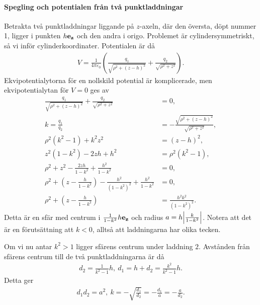 \paragraph{Spegling och potentialen från två punktladdningar}
Betrakta två punktladdningar liggande på $z$-axeln, där den översta, döpt nummer 1, ligger i punkten $h\vb{e}_{\vb{z}}$ och den andra i origo. Problemet är cylindersymmetriskt, så vi inför cylinderkoordinater. Potentialen är då
\begin{align*}
	V = \frac{1}{4\pi\varepsilon_{0}}\left(\frac{q_{1}}{\sqrt{\rho^{2} + (z - h)^{2}}} + \frac{q_{2}}{\sqrt{\rho^{2} + z^{2}}}\right).
\end{align*}
Ekvipotentialytorna för en nollskild potential är komplicerade, men ekvipotentialytan för $V = 0$ ges av
\begin{align*}
	\frac{q_{1}}{\sqrt{\rho^{2} + (z - h)^{2}}} + \frac{q_{2}}{\sqrt{\rho^{2} + z^{2}}} &= 0, \\
	k = \frac{q_{1}}{q_{2}}                                                             &= -\frac{\sqrt{\rho^{2} + (z - h)^{2}}}{\sqrt{\rho^{2} + z^{2}}}, \\
	\rho^{2}(k^{2} - 1) + k^{2}z^{2}                                                         &= (z - h)^{2}, \\
	z^{2}(1 - k^{2}) - 2zh + h^{2}                                                      &= \rho^{2}(k^{2} - 1), \\
	\rho^{2} + z^{2} - \frac{2zh}{1 - k^{2}} + \frac{h^{2}}{1 - k^{2}}                  &= 0, \\
	\rho^{2} + \left(z - \frac{h}{1 - k^{2}}\right) - \frac{h^{2}}{(1 - k^{2})^{2}} + \frac{h^{2}}{1 - k^{2}} &= 0, \\
	\rho^{2} + \left(z - \frac{h}{1 - k^{2}}\right)                                     &= \frac{h^{2}k^{2}}{(1 - k^{2})^{2}}.
\end{align*}
Detta är en sfär med centrum i $\frac{1}{1 - k^{2}}h\vb{e}_{\vb{z}}$ och radius $a = h\abs{\frac{k}{1 - k^{2}}}$. Notera att det är en förutsättning att $k < 0$, alltså att laddningarna har olika tecken.

Om vi nu antar $k^{2} > 1$ ligger sfärens centrum under laddning $2$. Avstånden från sfärens centrum till de två punktladdningarna är då
\begin{align*}
	d_{2} = \frac{1}{k^{2} - 1}h,\ d_{1} = h + d_{2} = \frac{k^{2}}{k^{2} - 1}h.
\end{align*}
Detta ger
\begin{align*}
	d_{1}d_{2} = a^{2},\ k = -\sqrt{\frac{d_{1}}{d_{2}}} = -\frac{d_{1}}{a} = -\frac{a}{d_{2}}.
\end{align*}

